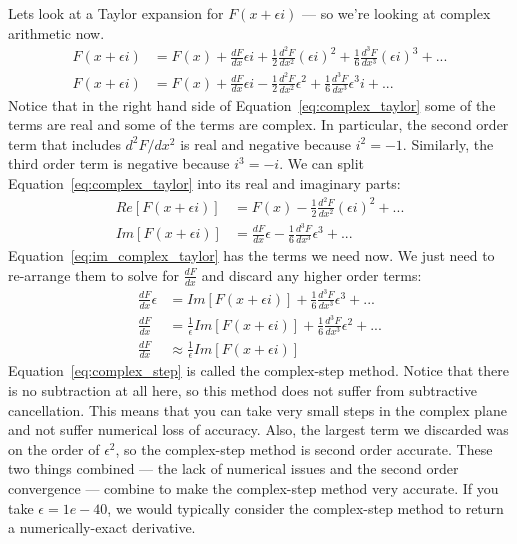 \documentclass[conf]{new-aiaa}
\begin{document}
    Lets look at a Taylor expansion for $F(x+\epsilon i)$ --- so we're looking at complex arithmetic now. 
    \begin{align}
        F(x+\epsilon i) &= F(x) + \frac{dF}{dx}\epsilon i + \frac{1}{2}\frac{d^2F}{dx^2} (\epsilon i)^2 +  \frac{1}{6}\frac{d^3F}{dx^3} (\epsilon i)^3 + ... \\
        F(x+\epsilon i) &= F(x) + \frac{dF}{dx}\epsilon i - \frac{1}{2}\frac{d^2F}{dx^2} \epsilon^2 +  \frac{1}{6}\frac{d^3F}{dx^3} \epsilon^3 i + ... \label{eq:complex_taylor}
    \end{align}
    Notice that in the right hand side of Equation~\eqref{eq:complex_taylor} some of the terms are real and some of the terms are complex. 
    In particular, the second order term that includes $d^2F/dx^2$ is real and negative because $i^2=-1$.  
    Similarly, the third order term is negative because $i^3=-i$.
    We can split Equation~\eqref{eq:complex_taylor} into its real and imaginary parts: 
    \begin{align}
        Re[F(x+\epsilon i)] &= F(x) - \frac{1}{2}\frac{d^2F}{dx^2} (\epsilon i)^2 + ... \\
        Im[F(x+\epsilon i)] &= \frac{dF}{dx}\epsilon -  \frac{1}{6}\frac{d^3F}{dx^3} \epsilon^3 + ... \label{eq:im_complex_taylor}
    \end{align}
    Equation~\eqref{eq:im_complex_taylor} has the terms we need now. 
    We just need to re-arrange them to solve for $\frac{dF}{dx}$ and discard any higher order terms: 
    \begin{align}
        \frac{dF}{dx}\epsilon  &= Im[F(x+\epsilon i)] + \frac{1}{6}\frac{d^3F}{dx^3} \epsilon^3 + ... \\
        \frac{dF}{dx}  &= \frac{1}{\epsilon}Im[F(x+\epsilon i)] + \frac{1}{6}\frac{d^3F}{dx^3} \epsilon^2 + ... \\
        \frac{dF}{dx}  &\approx \frac{1}{\epsilon}Im[F(x+\epsilon i)] \label{eq:complex_step}
    \end{align}
    Equation~\eqref{eq:complex_step} is called the complex-step method. 
    Notice that there is no subtraction at all here, so this method does not suffer from subtractive cancellation. 
    This means that you can take very small steps in the complex plane and not suffer numerical loss of accuracy. 
    Also, the largest term we discarded was on the order of $\epsilon^2$, so the complex-step method is second order accurate. 
    These two things combined --- the lack of numerical issues and the second order convergence --- combine to make the complex-step method very accurate. 
    If you take $\epsilon=1e-40$, we would typically consider the complex-step method to return a numerically-exact derivative. 
\end{document}
